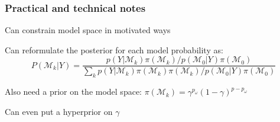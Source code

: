 \documentclass[xcolor=dvipsnames]{beamer}
\begin{document}
\begin{frame}
\frametitle{Practical and technical notes}

\bis
\item Can constrain model space in motivated ways
\item Can reformulate the posterior for each model probability as:
$$P(\mathcal{M}_k|Y) = \frac{p(Y| \mathcal{M}_k) \pi(\mathcal{M}_k)/p(\mathcal{M}_0|Y)\pi(\mathcal{M}_0)}{\sum_kp(Y| \mathcal{M}_k) \pi(\mathcal{M}_k) \pi(\mathcal{M}_k)/p(\mathcal{M}_0|Y)\pi(\mathcal{M}_0)} $$ 
\item Also need a prior on the model space:
$\pi(\mathcal{M}_k) = \gamma^{p_\omega}(1-\gamma)^{p-p_\omega}$
\item Can even put a hyperprior on $\gamma$
\ei

\end{frame}

\end{document}
